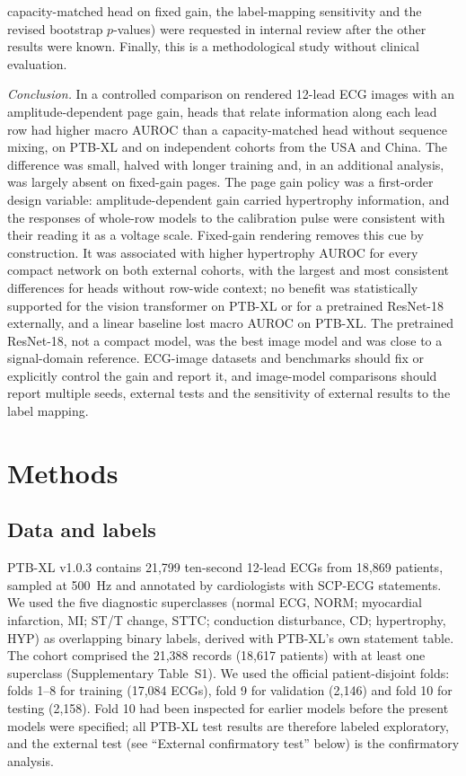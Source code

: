 \documentclass{wlscirep}
\begin{document}
capacity-matched head on fixed gain, the label-mapping sensitivity and the revised bootstrap $p$-values) were requested in internal review after the other results were known. Finally, this is a methodological study without clinical evaluation.

\emph{Conclusion.} In a controlled comparison on rendered 12-lead ECG images with an amplitude-dependent page gain, heads that relate information along each lead row had higher macro AUROC than a capacity-matched head without sequence mixing, on PTB-XL and on independent cohorts from the USA and China. The difference was small, halved with longer training and, in an additional analysis, was largely absent on fixed-gain pages. The page gain policy was a first-order design variable: amplitude-dependent gain carried hypertrophy information, and the responses of whole-row models to the calibration pulse were consistent with their reading it as a voltage scale. Fixed-gain rendering removes this cue by construction. It was associated with higher hypertrophy AUROC for every compact network on both external cohorts, with the largest and most consistent differences for heads without row-wide context; no benefit was statistically supported for the vision transformer on PTB-XL or for a pretrained ResNet-18 externally, and a linear baseline lost macro AUROC on PTB-XL. The pretrained ResNet-18, not a compact model, was the best image model and was close to a signal-domain reference. ECG-image datasets and benchmarks should fix or explicitly control the gain and report it, and image-model comparisons should report multiple seeds, external tests and the sensitivity of external results to the label mapping.

\section*{Methods}

\subsection*{Data and labels}
PTB-XL v1.0.3 \cite{wagner2020ptbxl,wagner2022ptbxl103,goldberger2000physionet} contains 21{,}799 ten-second 12-lead ECGs from 18{,}869 patients, sampled at 500~Hz and annotated by cardiologists with SCP-ECG statements. We used the five diagnostic superclasses (normal ECG, NORM; myocardial infarction, MI; ST/T change, STTC; conduction disturbance, CD; hypertrophy, HYP) as overlapping binary labels, derived with PTB-XL's own statement table. The cohort comprised the 21{,}388 records (18{,}617 patients) with at least one superclass (Supplementary Table~S1). We used the official patient-disjoint folds: folds 1--8 for training (17{,}084 ECGs), fold 9 for validation (2{,}146) and fold 10 for testing (2{,}158). Fold 10 had been inspected for earlier models before the present models were specified; all PTB-XL test results are therefore labeled exploratory, and the external test (see ``External confirmatory test'' below) is the confirmatory analysis.
\end{document}
